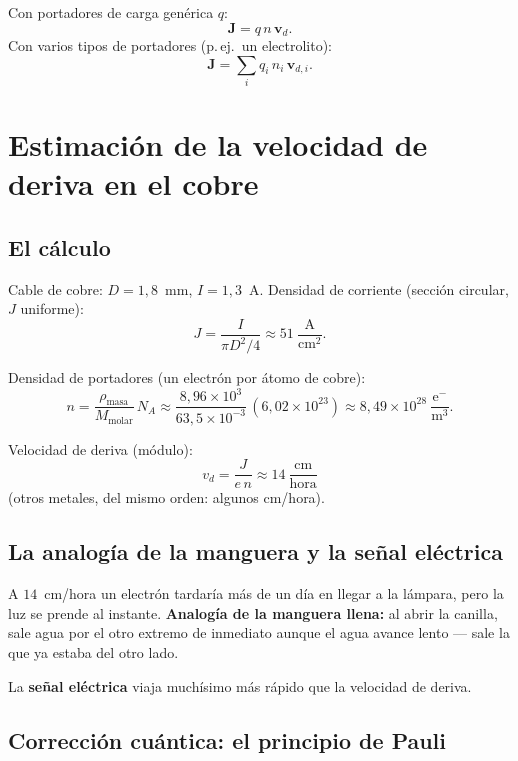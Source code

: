 \documentclass[12pt,a4paper]{article}
\begin{document}
Con portadores de carga genérica $q$:
\[
\boxed{\mathbf{J} = q\, n\, \mathbf{v}_d}.
\]
Con varios tipos de portadores (p.\,ej.\ un electrolito):
\[
\mathbf{J} = \sum_i q_i\, n_i\, \mathbf{v}_{d,i}.
\]

\section{Estimación de la velocidad de deriva en el cobre}

\subsection{El cálculo}

Cable de cobre: $D = 1{,}8$~mm, $I = 1{,}3$~A. Densidad de corriente
(sección circular, $J$ uniforme):
\[
J = \frac{I}{\pi D^2/4} \approx 51\ \frac{\text{A}}{\text{cm}^2}.
\]

Densidad de portadores (un electrón por átomo de cobre):
\[
n = \frac{\rho_{\text{masa}}}{M_{\text{molar}}}\, N_A
  \approx \frac{8{,}96\times10^{3}}{63{,}5\times10^{-3}}\,(6{,}02\times10^{23})
  \approx 8{,}49\times10^{28}\ \frac{\text{e}^-}{\text{m}^3}.
\]

Velocidad de deriva (módulo):
\[
\boxed{v_d = \frac{J}{e\, n} \approx 14\ \frac{\text{cm}}{\text{hora}}}
\]
(otros metales, del mismo orden: algunos cm/hora).

\subsection{La analogía de la manguera y la señal eléctrica}

A $14$~cm/hora un electrón tardaría más de un día en llegar a la lámpara,
pero la luz se prende al instante. \textbf{Analogía de la manguera
llena:} al abrir la canilla, sale agua por el otro extremo de inmediato
aunque el agua avance lento — sale la que ya estaba del otro lado.

\begin{keybox}[A retener]
  La \textbf{señal eléctrica} viaja muchísimo más rápido que la velocidad
  de deriva.
\end{keybox}



\subsection{Corrección cuántica: el principio de Pauli}
\end{document}
